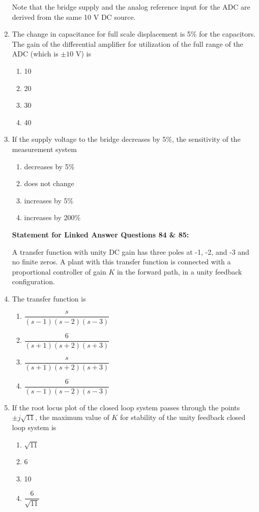 \documentclass[journal]{IEEEtran}
\begin{document}
\begin{enumerate}
Note that the bridge supply and the analog reference input for the ADC are derived from the same 10 V DC source. 

\item The change in capacitance for full scale displacement is 5\% for the capacitors. The gain of the differential amplifier for utilization of the full range of the ADC (which is $\pm 10$ V) is
\begin{multicols}{2}
\begin{enumerate}
\item 10  
\item 20  
\item 30 
\item 40  
\end{enumerate}
\end{multicols}

\item If the supply voltage to the bridge decreases by 5\%, the sensitivity of the measurement system
\begin{multicols}{2}
\begin{enumerate}
\item decreases by 5\%  
\item does not change  
\item increases by 5\%  
\item increases by 200\%  
\end{enumerate}
\end{multicols}


\textbf{Statement for Linked Answer Questions 84 \& 85:}  

A transfer function with unity DC gain has three poles at -1, -2, and -3 and no finite zeros. A plant with this transfer function is connected with a proportional controller of gain $K$ in the forward path, in a unity feedback configuration.  

\item The transfer function is
\begin{multicols}{2}
\begin{enumerate}
\item $\dfrac{s}{(s-1)(s-2)(s-3)}$
\item $\dfrac{6}{(s+1)(s+2)(s+3)}$
\item $\dfrac{s}{(s+1)(s+2)(s+3)}$
\item $\dfrac{6}{(s-1)(s-2)(s-3)}$
\end{enumerate}
\end{multicols}

\item If the root locus plot of the closed loop system passes through the points $\pm j\sqrt{11}$, the maximum value of $K$ for stability of the unity feedback closed loop system is
\begin{multicols}{2}
\begin{enumerate}
\item $\sqrt{11}$  
\item 6  
\item 10  
\item $\dfrac{6}{\sqrt{11}}$  
\end{enumerate}
\end{multicols}



\end{enumerate}
\end{document}
